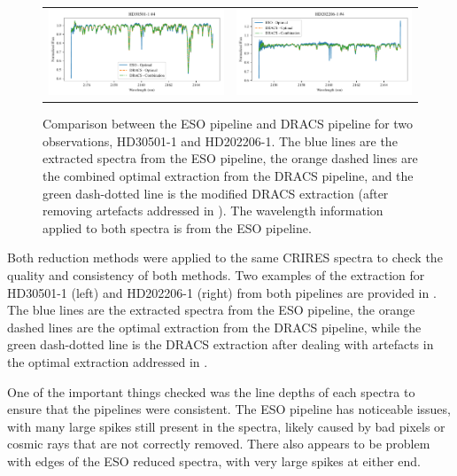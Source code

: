\begin{figure}
\begin{tabular}{cc}
        \includegraphics[width=0.5\linewidth]{figures/reduction/pipeline_compare/pipeline_compare_HD30501-1_chip_4} & \includegraphics[width=0.5\linewidth]{figures/reduction/pipeline_compare/pipeline_compare_HD202206-1_chip_4}\\
    \end{tabular}
    \caption{Comparison between the {ESO} pipeline and {DRACS} pipeline for two observations, {HD30501-1} and {HD202206-1}. The blue lines are the extracted spectra from the {ESO} pipeline, the orange dashed lines are the combined optimal extraction from the {DRACS} pipeline, and the green dash-dotted line is the modified {DRACS} extraction (after removing artefacts addressed in ). The wavelength information applied to both spectra is from the {ESO} pipeline.}
    \label{fig:reduction-comparison}
\end{figure}

Both reduction methods were applied to the same {CRIRES} spectra to check the quality and consistency of both methods.
Two examples of the extraction for HD30501-1 (left) and HD202206-1 (right) from both pipelines are provided in .
The blue lines are the extracted spectra from the {ESO} pipeline, the orange dashed lines are the optimal extraction from the {DRACS} pipeline, while the green dash-dotted line is the {DRACS} extraction after dealing with artefacts in the optimal extraction addressed in .

One of the important things checked was the line depths of each spectra to ensure that the pipelines were consistent. The {ESO} pipeline has noticeable issues, with many large spikes still present in the spectra, likely caused by bad pixels or cosmic rays that are not correctly removed. There also appears to be problem with edges of the {ESO} reduced spectra, with very large spikes at either end.

